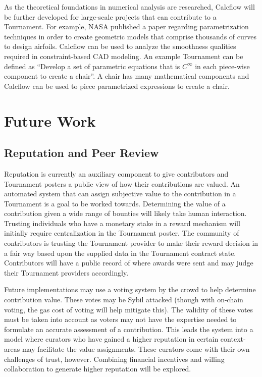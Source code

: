 \documentclass[a4paper, 10pt, conference]{ieeeconf}      %
\begin{document}
As the theoretical foundations in numerical analysis are researched, Calcflow will be further developed for large-scale projects that can contribute to a Tournament. 
For example, NASA\cite{samareh2001} published a paper regarding parametrization techniques in order to create geometric models that comprise thousands of curves to design airfoils. 
Calcflow can be used to analyze the smoothness qualities required in constraint-based CAD modeling.
An example Tournament can be defined as “Develop a set of parametric equations that is $C^{\infty}$ in each piece-wise component to create a chair”. 
A chair has many mathematical components and Calcflow can be used to piece parametrized expressions to create a chair.

\section{Future Work}\label{futurework}
\subsection{Reputation and Peer Review}\label{reputationandpeerreview}
Reputation is currently an auxiliary component to give contributors and Tournament posters a public view of how their contributions are valued. 
An automated system that can assign subjective value to the contribution in a Tournament is a goal to be worked towards. 
Determining the value of a contribution given a wide range of bounties will likely take human interaction. 
Trusting individuals who have a monetary stake in a reward mechanism will initially require centralization in the Tournament poster. 
The community of contributors is trusting the Tournament provider to make their reward decision in a fair way based upon the supplied data in the Tournament contract state. 
Contributors will have a public record of where awards were sent and may judge their Tournament providers accordingly. 

Future implementations may use a voting system by the crowd to help determine contribution value.
These votes may be Sybil attacked (though with on-chain voting, the gas cost of voting will help mitigate this). 
The validity of these votes must be taken into account as voters may not have the expertise needed to formulate an accurate assessment of a contribution. 
This leads the system into a model where curators who have gained a higher reputation in certain context-areas may facilitate the value assignments. 
These curators come with their own challenges of trust, however. 
Combining financial incentives and willing collaboration to generate higher reputation will be explored.
\end{document}
